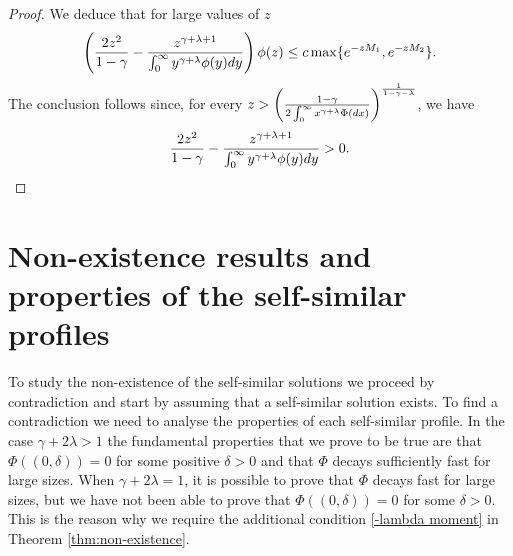 \documentclass[11pt]{article}
\numberwithin{equation}{section}
\theoremstyle{plain}
\newcommand{\der}{\textup{d}}
\begin{document}
\begin{proof}
We deduce that for large values of $z $
\begin{align*}
\left( \frac{2z^2 }{1-\gamma} - \frac{z^{\gamma +\lambda +1 }}{\int_0^\infty y^{\gamma + \lambda } \phi(y) \der y} \right)  \phi(z) \leq c \max\{e^{-z M_1}, e^{-z M_2}  \}.
\end{align*}
The conclusion follows since, for every $z > \left(\frac{1-\gamma}{2 \int_0^\infty x^{\gamma+\lambda} \Phi(\der x)}  \right)^{\frac{1}{1-\gamma-\lambda}}$, we have
\begin{align*}
     \frac{2z^2 }{1-\gamma} - \frac{z^{\gamma +\lambda +1 }}{\int_0^\infty y^{\gamma + \lambda } \phi(y) \der y}>0.
\end{align*}
\end{proof}

\section{Non-existence results and properties of the self-similar profiles} \label{sec:non existence}
To study the non-existence of the self-similar solutions we proceed by contradiction and start by assuming that a self-similar solution exists.
To find a contradiction we need to analyse the properties of each self-similar profile.
In the case $\gamma + 2 \lambda >1 $ the fundamental properties that we prove to be true are that $\Phi((0, \delta))=0$ for some positive $\delta>0$ and that $\Phi$ decays sufficiently fast for large sizes.
When $\gamma+2\lambda =1$, it is possible to prove that $\Phi$ decays fast for large sizes, but we have not been able to prove that $\Phi((0,\delta))=0$ for some $\delta>0$.
This is the reason why we require the additional condition \eqref{-lambda moment} in Theorem \ref{thm:non-existence}.
\end{document}
